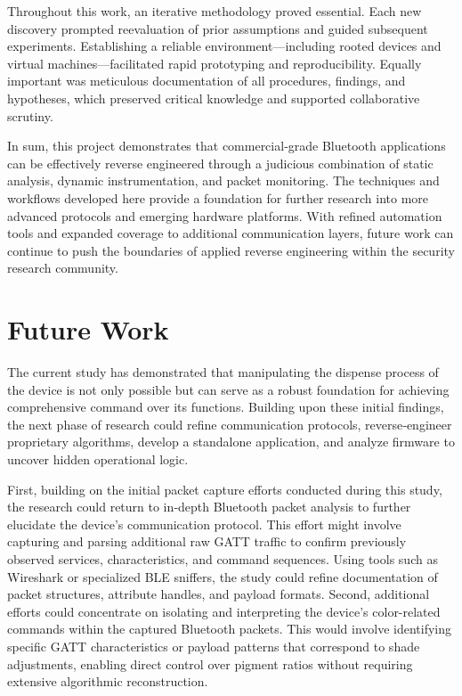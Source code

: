 Throughout this work, an iterative methodology proved essential. Each new discovery prompted reevaluation of prior assumptions and guided subsequent experiments. Establishing a reliable environment—including rooted devices and virtual machines—facilitated rapid prototyping and reproducibility. Equally important was meticulous documentation of all procedures, findings, and hypotheses, which preserved critical knowledge and supported collaborative scrutiny.

In sum, this project demonstrates that commercial‑grade 
Bluetooth applications can be effectively reverse engineered through a judicious combination of static analysis, dynamic instrumentation, and packet monitoring. The techniques and workflows developed here provide a foundation for further research into more advanced protocols and emerging hardware platforms. With refined automation tools and expanded coverage to additional communication layers, future work can continue to push the boundaries of applied reverse engineering within the security research community.

\section{Future Work}
The current study has demonstrated that manipulating the dispense process of the device is not only possible but can serve as a robust foundation for achieving comprehensive command over its functions. Building upon these initial findings, the next phase of research could refine communication protocols, reverse‑engineer proprietary algorithms, develop a standalone application, and analyze firmware to uncover hidden operational logic.

First, building on the initial packet capture efforts conducted during this study, the research could return to in‑depth Bluetooth packet analysis to further elucidate the device’s communication protocol. This effort might involve capturing and parsing additional raw GATT traffic to confirm previously observed services, characteristics, and command sequences. Using tools such as Wireshark or specialized BLE sniffers, the study could refine documentation of packet structures, attribute handles, and payload formats. 
Second, additional efforts could concentrate on isolating and interpreting the device’s color-related commands within the captured Bluetooth packets. This would involve identifying specific GATT characteristics or payload patterns that correspond to shade adjustments, enabling direct control over pigment ratios without requiring extensive algorithmic reconstruction.

